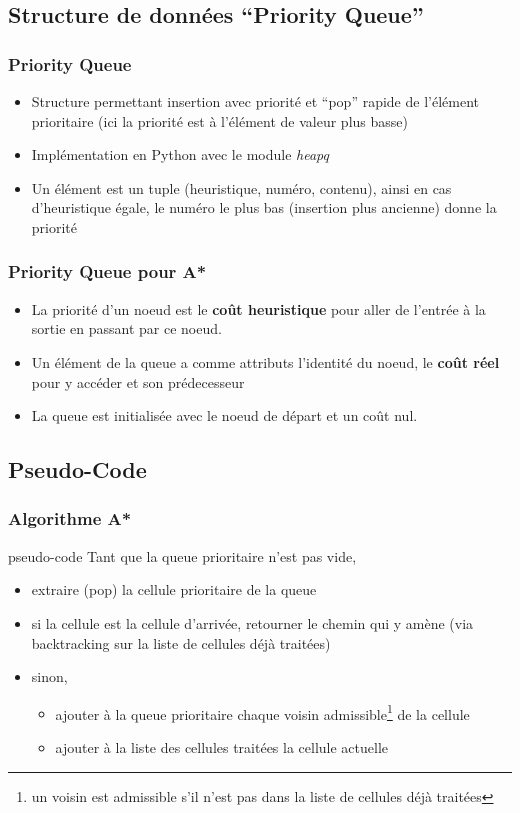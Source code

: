 \documentclass{beamer}
\begin{document}
\subsection{Structure de données ``Priority Queue''}
\begin{frame}
  \frametitle{Priority Queue}
  \begin{itemize}
  \item Structure permettant insertion avec priorité et ``pop'' rapide de
    l'élément prioritaire (ici la priorité est à l'élément de valeur plus basse)
  \item Implémentation en Python avec le module \textit{heapq}
  \item Un élément est un tuple (heuristique, numéro, contenu), ainsi en cas
    d'heuristique égale, le numéro le plus bas (insertion plus ancienne) donne
    la priorité
  \end{itemize}
\end{frame}
\begin{frame}
  \frametitle{Priority Queue pour A*}
  \begin{itemize}
  \item<1-> La priorité d'un noeud est le \textbf{coût heuristique} pour aller de
    l'entrée à la sortie en passant par ce noeud.
  \item<2-> Un élément de la queue a comme attributs l'identité du noeud, le
    \textbf{coût réel} pour y accéder et son prédecesseur
  \item<3-> La queue est initialisée avec le noeud de départ et un coût nul.
  \end{itemize}
\end{frame}

\subsection{Pseudo-Code}
\begin{frame}
  \frametitle{Algorithme A*}
  \begin{block}{pseudo-code}
    Tant que la queue prioritaire n'est pas vide,
    \begin{itemize}
    \item<2-> extraire (pop) la cellule prioritaire de la queue
    \item<3-> si la cellule est la cellule d'arrivée, retourner le chemin qui y amène
          (via backtracking sur la liste de cellules déjà traitées)
    \item<4-> sinon,
      \begin{itemize}
      \item<4-> ajouter à la queue prioritaire chaque voisin admissible\footnote{un
          voisin est admissible s'il n'est pas dans la liste de cellules déjà
          traitées} de la cellule
      \item<5-> ajouter à la liste des cellules traitées la cellule actuelle
      \end{itemize}
    \end{itemize}    
  \end{block}
\end{frame}
\end{document}
